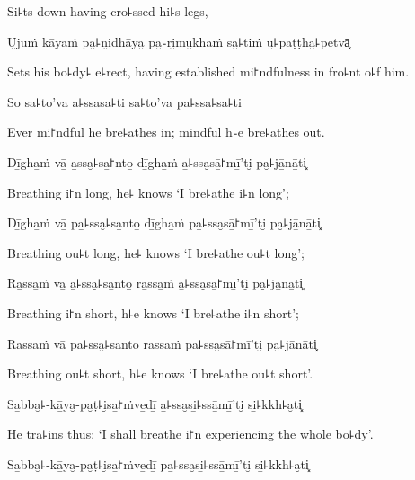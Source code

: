\begin{english}
  Si꜕ts down having cro꜕ssed hi꜕s legs,
\end{english}

U̮ju̱ṁ kā̱ya̱ṁ pa̮꜕ṇi̮dhā̱ya̮ pa̮꜕ri̮mu̮kha̱ṁ sa̮꜕ti̱ṁ u̮꜕pa̱ṭṭha̮꜕pe̱tvā͓

\begin{english}
  Sets his bo꜕dy꜕ e꜕rect, having established mi꜓ndfulness in fro꜕nt o꜕f him.
\end{english}

So sa꜕to'va a꜕ssasa꜕ti sa꜕to'va pa꜕ssa꜕sa꜕ti

\begin{english}
  Ever mi꜓ndful he bre꜕athes in; mindful h꜕e bre꜕athes out.
\end{english}

\ifaivedition
\clearpage
\fi

Dī̱gha̱ṁ vā̱ a̱ssa̮꜕sa̱꜓nto̱ dī̱gha̱ṁ a̱꜕ssa̮sā̱꜓mī̱'ti̮ pa̮꜕jā̱nā̱ti͓

\begin{english}
  Breathing i꜓n long, he꜕ knows `I bre꜕athe i꜕n long';
\end{english}

Dī̱gha̱ṁ vā̱ pa̱꜕ssa̮꜕sa̱nto̱ dī̱gha̱ṁ pa̱꜕ssa̮sā̱꜓mī̱'ti̮ pa̮꜕jā̱nā̱ti͓

\begin{english}
  Breathing ou꜕t long, he꜕ knows `I bre꜕athe ou꜕t long';
\end{english}

Ra̱ssa̱ṁ vā̱ a̱꜕ssa̮꜕sa̱nto̱ ra̱ssa̱ṁ a̱꜕ssa̮sā̱꜓mī̱'ti̮ pa̮꜕jā̱nā̱ti͓

\begin{english}
  Breathing i꜓n short, h꜕e knows `I bre꜕athe i꜕n short';
\end{english}

Ra̱ssa̱ṁ vā̱ pa̱꜕ssa̮꜕sa̱nto̱ ra̱ssa̱ṁ pa̱꜕ssa̮sā̱꜓mī̱'ti̮ pa̮꜕jā̱nā̱ti͓

\begin{english}
  Breathing ou꜕t short, h꜕e knows `I bre꜕athe ou꜕t short'.
\end{english}

Sa̱bba̮꜕-kā̱ya̮-pa̮ṭ꜕i̮sa̱꜓ṁve̱dī̱ a̱꜕ssa̮si̱꜕ssā̱mī̱'ti̮ si̱꜕kkh꜕a̮ti͓

\begin{english}
  He tra꜕ins thus: `I shall breathe i꜓n experiencing the whole bo꜕dy'.
\end{english}

Sa̱bba̮꜕-kā̱ya̮-pa̮ṭ꜕i̮sa̱꜓ṁve̱dī̱ pa̱꜕ssa̮si̱꜕ssā̱mī̱'ti̮ si̱꜕kkh꜕a̮ti͓


